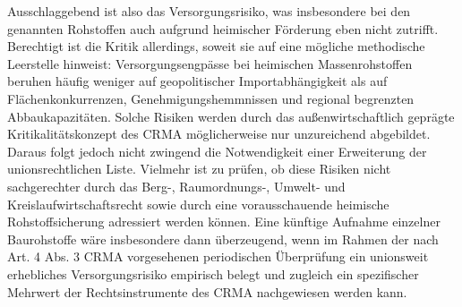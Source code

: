 \documentclass[12pt,a4paper,oneside]{book} %
\begin{document}
 Ausschlaggebend ist also das Versorgungsrisiko, was insbesondere bei den genannten Rohstoffen auch aufgrund heimischer Förderung eben nicht zutrifft. Berechtigt ist die Kritik allerdings, soweit sie auf eine mögliche methodische Leerstelle hinweist: Versorgungsengpässe bei heimischen Massenrohstoffen beruhen häufig weniger auf geopolitischer Importabhängigkeit als auf Flächenkonkurrenzen, Genehmigungshemmnissen und regional begrenzten Abbaukapazitäten. Solche Risiken werden durch das außenwirtschaftlich geprägte Kritikalitätskonzept des CRMA möglicherweise nur unzureichend abgebildet. Daraus folgt jedoch nicht zwingend die Notwendigkeit einer Erweiterung der unionsrechtlichen Liste. Vielmehr ist zu prüfen, ob diese Risiken nicht sachgerechter durch das Berg-, Raumordnungs-, Umwelt- und Kreislaufwirtschaftsrecht sowie durch eine vorausschauende heimische Rohstoffsicherung adressiert werden können. Eine künftige Aufnahme einzelner Baurohstoffe wäre insbesondere dann überzeugend, wenn im Rahmen der nach Art. 4 Abs. 3 CRMA vorgesehenen periodischen Überprüfung ein unionsweit erhebliches Versorgungsrisiko empirisch belegt und zugleich ein spezifischer Mehrwert der Rechtsinstrumente des CRMA nachgewiesen werden kann.

\end{document}
